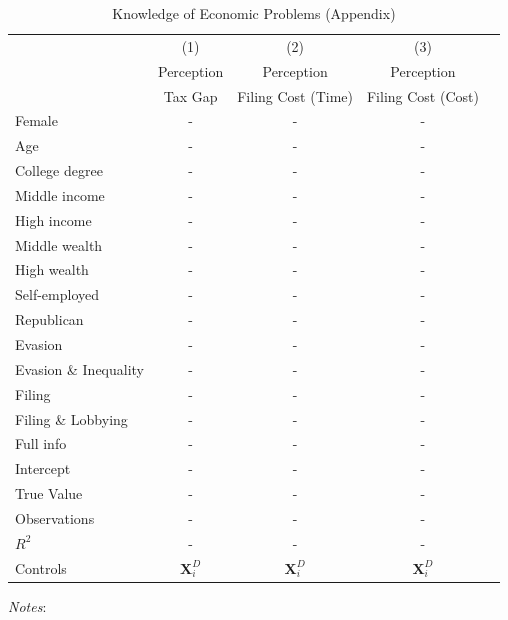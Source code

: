 \documentclass[11pt]{article}
\begin{document}
\begin{table}[!htbp]\centering
\caption{Knowledge of Economic Problems (Appendix)}
\label{tab:perception}
\begin{threeparttable}
\begin{tabular}{lcccc}
\toprule
 & (1) & (2) & (3)  \\
 & Perception & Perception & Perception\\
 & Tax Gap & Filing Cost (Time) & Filing Cost (Cost)\\
\midrule
Female                     &-& - & - \\
Age                        &-& - & - \\
College degree             &-& - & - \\
Middle income              &-& - & - \\
High income                &-& - & - \\
Middle wealth              &-& - & - \\
High wealth                &-& - & - \\
Self-employed              &-& - & - \\
Republican                 &-& - & - \\[0.5em]
Evasion       & - & - & - \\
Evasion \& Inequality     & - & - & - \\
Filing            & - & - & - \\
Filing \& Lobbying            & - & - & - \\
Full info               & - & - & - \\[0.5em]
Intercept              &   -& -   & -  \\
\midrule
True Value & - & - & -\\
\midrule
Observations               & - & - & -       \\
$R^2$                      & - & - & -       \\
Controls                   & $\mathbf{X}_{i}^{D}$& $\mathbf{X}_{i}^{D}$& $\mathbf{X}_{i}^{D}$\\
\bottomrule
\end{tabular}
\begin{tablenotes}[flushleft]
\footnotesize
\item \textit{Notes}:
\end{tablenotes}
\end{threeparttable}
\end{table}
\end{document}
